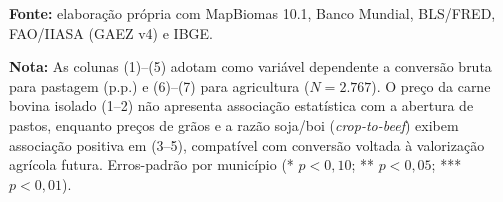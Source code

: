 \begin{table}[htbp]
\begin{tabular}{lccccccc}
\bottomrule
\end{tabular}
\par\smallskip\begin{minipage}{\textwidth}\footnotesize
\SingleSpacing
\noindent\textbf{Fonte:} elaboração própria com MapBiomas 10.1, Banco Mundial, BLS/FRED, FAO/IIASA (GAEZ v4) e IBGE.\par\medskip
\noindent\textbf{Nota:} As colunas (1)--(5) adotam como variável dependente a conversão bruta para pastagem (p.p.) e (6)--(7) para agricultura ($N = 2.767$). O preço da carne bovina isolado (1--2) não apresenta associação estatística com a abertura de pastos, enquanto preços de grãos e a razão soja/boi (\textit{crop-to-beef}) exibem associação positiva em (3--5), compatível com conversão voltada à valorização agrícola futura. Erros-padrão por município (* $p<0{,}10$; ** $p<0{,}05$; *** $p<0{,}01$).
\end{minipage}
\end{table}
